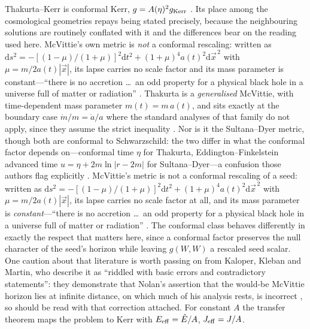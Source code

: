 \documentclass[12pt]{iopart}
\theoremstyle{plain}
\theoremstyle{definition}
\theoremstyle{remark}
\newcommand{\Ehat}{\hat E}
\newcommand{\dd}{\mathrm{d}}
\begin{document}
Thakurta--Kerr is conformal Kerr, $g=A(\eta)^2 g_{\rm Kerr}$
\cite{Thakurta1981,Kerr1963}. Its place among the cosmological
geometries repays being stated precisely, because the neighbouring solutions are
routinely conflated with it and the differences bear on the reading used here.
McVittie's own metric is \emph{not} a conformal rescaling: written as
$\dd s^2=-[(1-\mu)/(1+\mu)]^2\dd t^2+(1+\mu)^4a(t)^2\dd\vec x^{\,2}$ with
$\mu=m/2a(t)|\vec x|$, its lapse carries no scale factor and its mass parameter is
constant---``there is no accretion \dots\ an odd property for a physical black hole
in a universe full of matter or radiation'' \cite[\S I]{Kaloper2010}. Thakurta is a
\emph{generalised} McVittie, with time-dependent mass parameter $m(t)=m\,a(t)$, and
sits exactly at the boundary case $\dot m/m=\dot a/a$ where the standard analyses of
that family do not apply, since they assume the strict inequality
\cite[\S II\,A]{MelloMaciel2017}. Nor is it the Sultana--Dyer metric, though both
are conformal to Schwarzschild: the two differ in what the conformal factor depends
on---conformal time $\eta$ for Thakurta, Eddington--Finkelstein advanced time
$u=\eta+2m\ln|r-2m|$ for Sultana--Dyer---a confusion those authors flag explicitly
\cite[\S II\,A]{MelloMaciel2017}. McVittie's metric is not a conformal rescaling of
a seed: written as
$\dd s^2=-[(1-\mu)/(1+\mu)]^2\dd t^2+(1+\mu)^4a(t)^2\dd\vec x^{\,2}$ with
$\mu=m/2a(t)|\vec x|$, its lapse carries no scale factor at all, and its mass
parameter is \emph{constant}---``there is no accretion \dots\ an odd property for a
physical black hole in a universe full of matter or radiation''
\cite[\S I]{Kaloper2010}. The conformal class behaves differently in exactly the
respect that matters here, since a conformal factor preserves the null character of
the seed's horizon while leaving $g(W,W)$ a rescaled seed scalar. One caution about
that literature is worth passing on from Kaloper, Kleban and Martin, who describe it
as ``riddled with basic errors and contradictory statements'': they demonstrate that
Nolan's assertion that the would-be McVittie horizon lies at infinite distance, on
which much of his analysis rests, is incorrect \cite[\S I]{Kaloper2010}, so
\cite{NolanMcVittie1998} should be read with that correction attached.
For constant $A$
the transfer theorem maps the problem to Kerr with $E_{\rm eff}=\Ehat/A$,
$J_{\rm eff}=J/A$.
\end{document}
